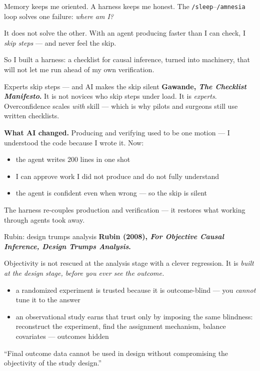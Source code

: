 \documentclass[aspectratio=169,11pt]{beamer}
\begin{document}
\begin{frame}{Memory keeps me oriented. A harness keeps me honest.}
The \texttt{/sleep}--\texttt{/amnesia} loop solves one failure: \emph{where am I?}
\vspace{0.3cm}

It does not solve the other. With an agent producing faster than I can check, I \emph{skip steps} --- and never feel the skip.
\vspace{0.35cm}

\alert{So I built a harness: a checklist for causal inference, turned into machinery, that will not let me run ahead of my own verification.}
\end{frame}

\begin{frame}{Experts skip steps --- and AI makes the skip silent}
\textbf{Gawande, \emph{The Checklist Manifesto}.} It is not novices who skip steps under load. It is \emph{experts}. Overconfidence scales \emph{with} skill --- which is why pilots and surgeons still use written checklists.
\vspace{0.3cm}

\textbf{What AI changed.} Producing and verifying used to be one motion --- I understood the code because I wrote it. Now:
\begin{itemize}\setlength\itemsep{0.22em}
    \item the agent writes 200 lines in one shot
    \item I can approve work I did not produce and do not fully understand
    \item the agent is confident even when wrong --- so the skip is silent
\end{itemize}
\vspace{0.2cm}

\alert{The harness re-couples production and verification --- it restores what working through agents took away.}
\end{frame}

\begin{frame}{Rubin: design trumps analysis}
\textbf{Rubin (2008), \emph{For Objective Causal Inference, Design Trumps Analysis}.}
\vspace{0.3cm}

Objectivity is not rescued at the analysis stage with a clever regression. It is \emph{built at the design stage, before you ever see the outcome.}
\vspace{0.3cm}
\begin{itemize}\setlength\itemsep{0.22em}
    \item a randomized experiment is trusted because it is outcome-blind --- you \emph{cannot} tune it to the answer
    \item an observational study earns that trust only by imposing the same blindness: reconstruct the experiment, find the assignment mechanism, balance covariates --- outcomes hidden
\end{itemize}
\vspace{0.2cm}

\alert{``Final outcome data cannot be used in design without compromising the objectivity of the study design.''}
\end{frame}
\end{document}
